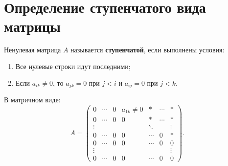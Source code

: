 \section{Определение ступенчатого вида матрицы}

\begin{definition}
Ненулевая матрица $A$ называется \textbf{ступенчатой}, если выполнены условия:
\begin{enumerate}
    \item Все нулевые строки идут последними;
    \item Если $a_{ik} \neq 0$, то $a_{jk} = 0$ при $j < i$ и $a_{ij} = 0$ при $j < k$.
\end{enumerate}

В матричном виде:
\[
A = \begin{pmatrix}
0 & \cdots & 0 & a_{1k} \neq 0 & * & \cdots & * \\
0 & \cdots & 0 & 0 & * & \cdots & * \\
\vdots & & & & \ddots & & \vdots \\
0 & \cdots & 0 & 0 & \cdots & 0 & * \\
0 & \cdots & 0 & 0 & \cdots & 0 & 0 \\
\vdots & & & & & & \vdots \\
0 & \cdots & 0 & 0 & \cdots & 0 & 0
\end{pmatrix}.
\]
\end{definition}
